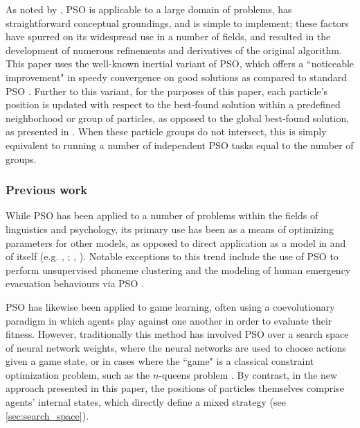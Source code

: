 \documentclass[12pt,a4paper]{article}
\begin{document}
As noted by \citet*{yang2014}, PSO is applicable to a large domain of problems, has straightforward conceptual groundings, and is simple to implement; these factors have spurred on its widespread use in a number of fields, and resulted in the development of numerous refinements and derivatives of the original algorithm. This paper uses the well-known inertial variant of PSO, which offers a ``noticeable improvement" in speedy convergence on good solutions as compared to standard PSO \citep{yang2014}. Further to this variant, for the purposes of this paper, each particle's position is updated with respect to the best-found solution within a predefined neighborhood or group of particles, as opposed to the global best-found solution, as presented in \citet*{solnon2010}. When these particle groups do not intersect, this is simply equivalent to running a number of independent PSO tasks equal to the number of groups.



\subsubsection{Previous work}
\label{sec:pso_prev_work}

While PSO has been applied to a number of problems within the fields of linguistics and psychology, its primary use has been as a means of optimizing parameters for other models, as opposed to direct application as a model in and of itself (e.g. \citeauthor{chatterjee2005}, \citeyear{chatterjee2005}; \citeauthor{mehdad2009}, \citeyear{mehdad2009}). Notable exceptions to this trend include the use of PSO to perform unsupervised phoneme clustering \citep{ahmadi2007} and the modeling of human emergency evacuation behaviours via PSO \citep{cheng2008}.

PSO has likewise been applied to game learning, often using a coevolutionary paradigm in which agents play against one another in order to evaluate their fitness. However, traditionally this method has involved PSO over a search space of neural network weights, where the neural networks are used to choose actions given a game state, or in cases where the ``game" is a classical constraint optimization problem, such as the $n$-queens problem \citep{engelbrecht2005}. By contrast, in the new approach presented in this paper, the positions of particles themselves comprise agents' internal states, which directly define a mixed strategy (see \autoref{sec:search_space}).  
\end{document}
